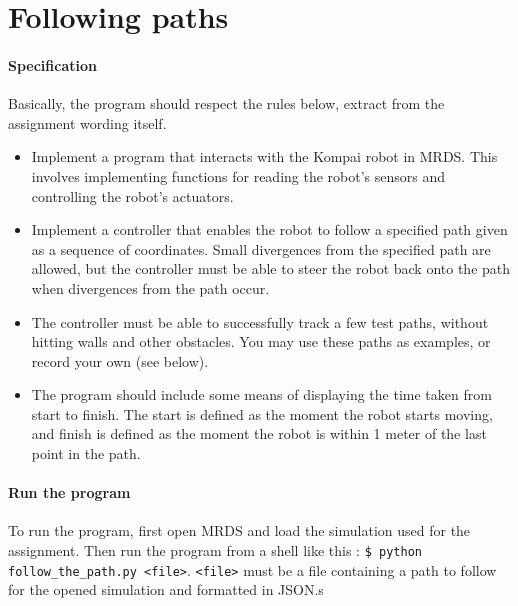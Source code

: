 
\section{Following paths}

\paragraph{Specification}{
    Basically, the program should respect the rules below, extract from the assignment wording itself.
    \begin{itemize}
        \item Implement a program that interacts with the Kompai robot in MRDS.
        This involves implementing functions for reading the robot's sensors
        and controlling the robot's actuators.
        
        \item Implement a controller that enables the robot to follow a
        specified path given as a sequence of coordinates. Small divergences
        from the specified path are allowed, but the controller must be able to
        steer the robot back onto the path when divergences from the path occur.
        
        \item The controller must be able to successfully track a few test
        paths, without hitting walls and other obstacles. You may use these
        paths as examples, or record your own (see below).
        
        \item The program should include some means of displaying the time
        taken from start to finish. The start is defined as the moment the
        robot starts moving, and finish is defined as the moment the robot is
        within 1 meter of the last point in the path.
    \end{itemize}

}


\paragraph{Run the program}{
    To run the program, first open MRDS and load the simulation used for the
 assignment. Then run the program from a shell like this : \texttt{\$ python
 follow\_the\_path.py <file>}. \texttt{<file>} must be a file containing a path
 to follow for the opened simulation and formatted in JSON.s
}

